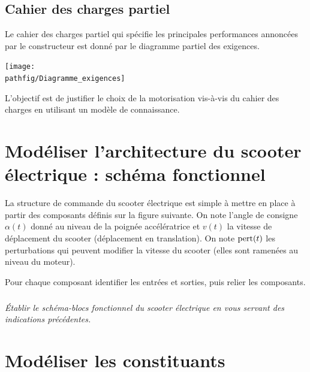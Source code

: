 \documentclass[10pt,fleqn]{article} %
\begin{document}
\begin{multicols}{2}
\subsection*{Cahier des charges partiel}

Le cahier des charges partiel qui spécifie les principales performances annoncées par le constructeur est donné par le diagramme partiel des exigences.%



\texttt{[image: \\pathfig/Diagramme\_exigences]}

%



\begin{obj}
L'objectif est de justifier le choix de la motorisation vis-à-vis du cahier des charges en utilisant un modèle de connaissance.
\end{obj}

\section*{Modéliser l'architecture du scooter électrique : schéma fonctionnel\newline}

La structure de commande du scooter électrique est simple à mettre en place à partir des composants  définis sur la figure suivante. On note l'angle de consigne $\alpha(t)$ donné au niveau de la poignée accélératrice et $v(t)$ la vitesse de déplacement du scooter (déplacement en translation). On note ${\rm pert}(t)$ les perturbations qui peuvent modifier la vitesse du scooter (elles sont ramenées au niveau du moteur).

\begin{methode}
Pour chaque composant identifier les entrées et sorties, puis relier les composants.
\end{methode}

\subparagraph{}\textit{Établir le schéma-blocs fonctionnel du scooter électrique en vous servant des indications précédentes.}


\section*{Modéliser les constituants}


\end{multicols}
\end{document}
